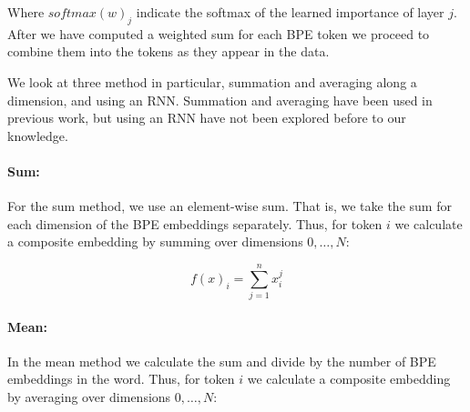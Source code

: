 \documentclass[11pt]{article}
\newcommand\jp[1]{(\textbf{JP:} #1)}
\begin{document}
        Where $softmax(w)_j$ indicate the softmax of the learned
     importance of layer $j$. After we have computed a weighted sum for
     each BPE token we proceed to combine them into the tokens as they
     appear in the data.
    
	


        We look at three method in particular, summation and averaging
     along a dimension, and using an RNN. Summation and averaging have been
     used in previous work, but using an RNN have not been explored
     before to our knowledge.
    
    	\paragraph{Sum:} For the sum method, we use an element-wise
     sum. That is, we take the sum for each dimension of the BPE
     embeddings separately. Thus, for token $i$ we calculate a
     composite embedding by summing over dimensions $0,\ldots,N$:
	
	\begin{equation}
	f(x)_i = \sum_{j=1}^{n} x_i^j
	\end{equation}
	

    	\paragraph{Mean:} In the mean method we calculate the sum and
     divide by the number of BPE embeddings in the word. Thus, for
     token $i$ we calculate a composite embedding by averaging over
     dimensions $0,\ldots,N$:
	
\end{document}
